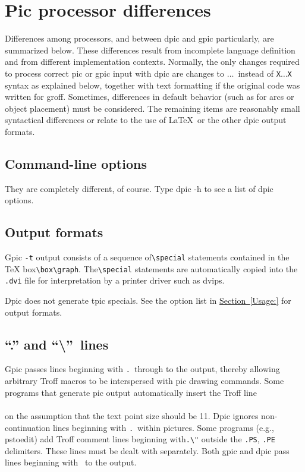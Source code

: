 \documentclass[11pt]{article}
\newcommand{\bq}{}
\newcommand{\groff}{{\bq groff}\xspace}
\newcommand{\ntt}[1]{\\\hbox{}\quad{\tt #1}}
\newcommand{\tBS}{{\tt\char92}}
\newcommand{\tLB}{{\tt\char123}}
\newcommand{\tRB}{{\tt\char125}}
\newcommand{\SR}[1]{\hyperref[#1]{Section~\ref*{#1}}}
\begin{document}
\section{Pic processor differences}\label{Diffs:}
Differences among processors, and between dpic and gpic particularly,
are summarized below.
These differences result from incomplete language definition and
from different implementation contexts.
Normally, the
only changes required to process correct pic or gpic input with dpic are
changes to \tLB$\ldots$\tRB\ instead of {\tt X}$\ldots${\tt X}
syntax as explained below, together with text formatting
if the original code was written for \groff.
Sometimes, differences in default behavior (such as for arcs or object
placement) must be considered.
The remaining items are reasonably small syntactical differences or
relate to the use of \LaTeX\ or the other dpic output formats.


\subsection{Command-line options}  They are completely different, of course.
  Type dpic -h to see a list of dpic options.

\subsection{Output formats}
  Gpic {\tt-t} output consists of a sequence of\verb|\special| statements
  contained in the TeX box\verb|\box\graph|.  The\verb|\special| statements
  are
  automatically copied into the {\tt.dvi} file for interpretation by a
  printer driver such as dvips.

  Dpic does not generate tpic specials.
  See the option list in \SR{Usage:} for output formats.

\subsection{``{.}'' and ``\textbackslash''\ lines}
  Gpic passes lines beginning with {\tt.}\ through to the output,
  thereby allowing
  arbitrary Troff macros to be interspersed with pic drawing commands.  Some
  programs that generate pic output automatically insert the Troff line
  \ntt{.ps 11}\\
  on the assumption that the text point size should be 11.  Dpic ignores
  non-continuation lines beginning with {\tt.}\ within pictures.
  Some programs (e.g., pstoedit) add Troff
  comment lines beginning with\verb|.\"| outside the
  {\tt.PS}, {\tt.PE} delimiters.  These
  lines must be dealt with separately.
  Both gpic and dpic pass lines beginning with \tBS\ to the output.
\end{document}
